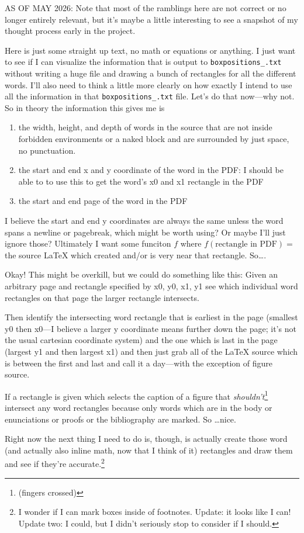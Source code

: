\documentclass{amsart}
\begin{document}
{\sc \large AS OF MAY 2026: }
Note that most of the ramblings here are not correct or no longer entirely relevant, but it's maybe a little interesting to see a snapshot of my thought process early in the project.
\bigskip

Here is just some straight up text, no math or equations or anything. I just want to see if I can visualize the information that is output to \texttt{boxpositions\_.txt} without writing a huge file and drawing a bunch of rectangles for all the different words. I'll also need to think a little more clearly on how exactly I intend to use all the information in that {\tt boxpositions\_.txt} file. Let's do that now---why not. So in theory the information this gives me is
\begin{enumerate}
\item the width, height, and depth of words in the source that are not inside forbidden environments or a naked block and are surrounded by just space, no punctuation.
\item the start and end x and y coordinate of the word in the PDF: I should be able to to use this to get the word's x0 and x1 rectangle in the PDF
\item the start and end page of the word in the PDF
\end{enumerate}
I believe the start and end y coordinates are always the same unless the word spans a newline or pagebreak, which might be worth using? Or maybe I'll just ignore those? Ultimately I want some funciton $f$ where $f(\text{rectangle in PDF}) = $ the source \LaTeX{} which created and/or is very near that rectangle. So\dots.

Okay! This might be overkill, but we could do something like this:
Given an arbitrary page and rectangle specified by x0, y0, x1, y1 see which individual word rectangles on that page the larger rectangle intersects.

Then identify the intersecting word rectangle that is earliest in the page (smallest y0 then x0---I believe a larger y coordinate means further down the page; it's not the usual cartesian coordinate system) and the one which is last in the page (largest y1 and then largest x1) and then just grab all of the \LaTeX{} source which is between the first and last and call it a day---with the exception of figure source.

If a rectangle is given which selects the caption of a figure that \textit{shouldn't}\footnote{(fingers crossed)} intersect any word rectangles because only words which are in the body or enunciations or proofs or the bibliography are marked. So \dots nice.

Right now the next thing I need to do is, though, is actually create those word (and actually also inline math, now that I think of it) rectangles and draw them and see if they're accurate.\footnote[9001]{I wonder if I can mark boxes inside of footnotes. Update: it looks like I can! Update two: I could, but I didn't seriously stop to consider if I should.}
\end{document}
